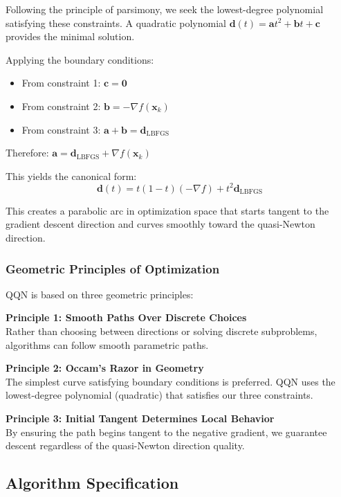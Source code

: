 Following the principle of parsimony, we seek the lowest-degree polynomial satisfying these constraints.
A quadratic polynomial \(\mathbf{d}(t) = \mathbf{a}t^2 + \mathbf{b}t + \mathbf{c}\) provides the minimal solution.

Applying the boundary conditions:

\begin{itemize}
\tightlist
\item
  From constraint 1: \(\mathbf{c} = \mathbf{0}\)
\item
  From constraint 2: \(\mathbf{b} = -\nabla f(\mathbf{x}_k)\)
\item
  From constraint 3: \(\mathbf{a} + \mathbf{b} = \mathbf{d}_{\text{LBFGS}}\)
\end{itemize}

Therefore: \(\mathbf{a} = \mathbf{d}_{\text{LBFGS}} + \nabla f(\mathbf{x}_k)\)

This yields the canonical form:
\[\mathbf{d}(t) = t(1-t)(-\nabla f) + t^2 \mathbf{d}_{\text{LBFGS}}\]

This creates a parabolic arc in optimization space that starts tangent to the gradient descent direction and curves smoothly toward the quasi-Newton direction.

\hypertarget{geometric-principles-of-optimization}{%
\subsubsection{Geometric Principles of Optimization}\label{geometric-principles-of-optimization}}

QQN is based on three geometric principles:

\textbf{Principle 1: Smooth Paths Over Discrete Choices}\\
Rather than choosing between directions or solving discrete subproblems, algorithms can follow smooth parametric paths.

\textbf{Principle 2: Occam's Razor in Geometry}\\
The simplest curve satisfying boundary conditions is preferred. QQN uses the lowest-degree polynomial (quadratic) that satisfies our three constraints.

\textbf{Principle 3: Initial Tangent Determines Local Behavior}\\
By ensuring the path begins tangent to the negative gradient, we guarantee descent regardless of the quasi-Newton direction quality.

\hypertarget{algorithm-specification}{%
\subsection{Algorithm Specification}\label{algorithm-specification}}

